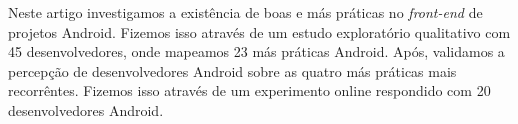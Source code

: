 Neste artigo investigamos a existência de boas e más práticas no \textit{front-end} de projetos Android. Fizemos isso através de um estudo exploratório qualitativo com 45 desenvolvedores, onde mapeamos 23 más práticas Android. Após, validamos a percepção de desenvolvedores Android sobre as quatro más práticas mais recorrêntes. Fizemos isso através de um experimento online respondido com 20 desenvolvedores Android. 










